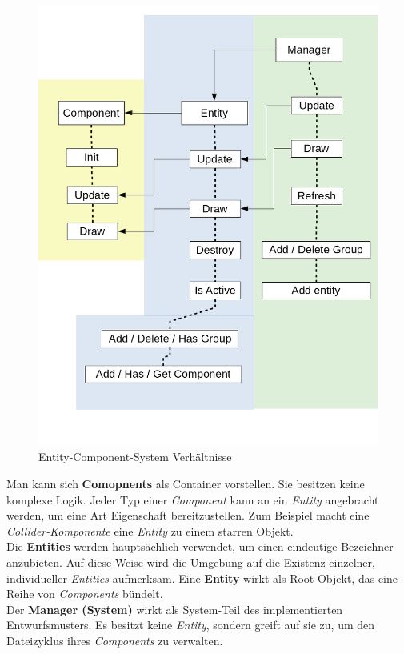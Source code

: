 \documentclass[
  10pt,
  a4paper,
  oneside,
  headers,
  headinclude,
  footinclude,
  BCOR5mm,
]{article}
\begin{document}
\begin{figure}[h]
  \centering
  \includegraphics[scale=0.3]{Scheme}
  \caption{Entity-Component-System Verhältnisse}
  \label{fig:ECS}
\end{figure}

Man kann sich \textbf{Comopnents} als Container vorstellen. Sie besitzen keine
komplexe Logik. Jeder Typ einer \textit{Component} kann an ein \textit{Entity}
angebracht werden, um eine Art Eigenschaft bereitzustellen. Zum Beispiel macht
eine \textit{Collider-Komponente} eine \textit{Entity} zu einem starren Objekt. \\
Die \textbf{Entities} werden hauptsächlich verwendet, um einen eindeutige
Bezeichner anzubieten. Auf diese Weise wird die Umgebung auf die Existenz
einzelner, individueller \textit{Entities} aufmerksam. Eine \textbf{Entity}
wirkt als Root-Objekt, das eine Reihe von \textit{Components} bündelt. \\
Der \textbf{Manager (System)} wirkt als System-Teil des implementierten
Entwurfsmusters. Es besitzt keine \textit{Entity}, sondern greift auf sie zu, um
den Dateizyklus ihres \textit{Components} zu verwalten.
\end{document}

